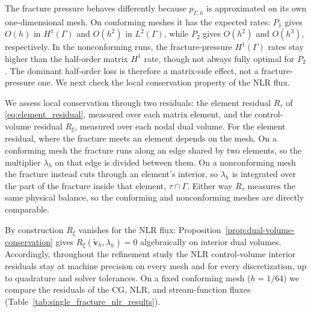 \documentclass[a4paper,fleqn]{cas-sc}
\newcommand{\vflux}{\mathbf{v}}
\begin{document}
The fracture pressure behaves differently because \(p_{\Gamma,h}\) is
approximated on its own one-dimensional mesh. On conforming meshes it has the
expected rates: \(P_1\) gives \(O(h)\) in \(H^1(\Gamma)\) and \(O(h^2)\) in
\(L^2(\Gamma)\), while \(P_2\) gives \(O(h^2)\) and \(O(h^3)\), respectively. In
the nonconforming runs, the fracture-pressure \(H^1(\Gamma)\) rates stay higher
than the half-order matrix \(H^1\) rate, though not always fully optimal for \(P_2\). The
dominant half-order loss is therefore a matrix-side effect, not a
fracture-pressure one. We next check the local conservation property of the NLR
flux.


We assess local conservation through two residuals: the element residual
\(R_\tau\) of \eqref{eq:element_residual}, measured over each matrix element, and
the control-volume residual \(R_\xi\), measured over each nodal dual volume. For the
element residual, where the fracture meets an element depends on the mesh. On a
conforming mesh the fracture runs along an edge shared by two elements, so the
multiplier \(\lambda_h\) on that edge is divided between them. On a nonconforming
mesh the fracture instead cuts through an element's interior, so \(\lambda_h\) is
integrated over the part of the fracture inside that element, \(\tau\cap\Gamma\).
Either way \(R_\tau\) measures the same physical balance, so the conforming and
nonconforming meshes are directly comparable.

By construction \(R_\xi\) vanishes for the NLR flux:
Proposition~\ref{prop:dual-volume-conservation} gives
\(R_\xi(\widetilde{\vflux}_h,\lambda_h)=0\) algebraically on interior dual
volumes. Accordingly, throughout the refinement study the NLR control-volume
interior residuals stay at machine precision on every mesh and for every
discretization, up to quadrature and solver tolerances. On a fixed conforming mesh
(\(h=1/64\)) we compare the residuals of the CG, NLR, and stream-function fluxes
(Table~\ref{tab:single_fracture_nlr_results}).
\end{document}
